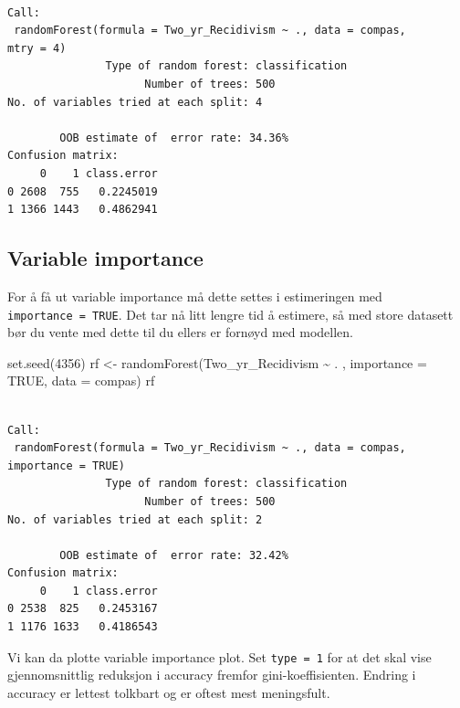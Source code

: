 \documentclass[
  letterpaper,
  DIV=11,
  numbers=noendperiod]{scrreprt}
\newenvironment{Shaded}{\begin{snugshade}}{\end{snugshade}}
\newcommand{\AttributeTok}[1]{\textcolor[rgb]{0.40,0.45,0.13}{#1}}
\newcommand{\ConstantTok}[1]{\textcolor[rgb]{0.56,0.35,0.01}{#1}}
\newcommand{\DecValTok}[1]{\textcolor[rgb]{0.68,0.00,0.00}{#1}}
\newcommand{\FunctionTok}[1]{\textcolor[rgb]{0.28,0.35,0.67}{#1}}
\newcommand{\NormalTok}[1]{\textcolor[rgb]{0.00,0.23,0.31}{#1}}
\newcommand{\OtherTok}[1]{\textcolor[rgb]{0.00,0.23,0.31}{#1}}
\newcommand{\SpecialCharTok}[1]{\textcolor[rgb]{0.37,0.37,0.37}{#1}}
\theoremstyle{definition}
\theoremstyle{remark}
\begin{document}
\begin{verbatim}

Call:
 randomForest(formula = Two_yr_Recidivism ~ ., data = compas,      mtry = 4) 
               Type of random forest: classification
                     Number of trees: 500
No. of variables tried at each split: 4

        OOB estimate of  error rate: 34.36%
Confusion matrix:
     0    1 class.error
0 2608  755   0.2245019
1 1366 1443   0.4862941
\end{verbatim}

\hypertarget{variable-importance}{%
\subsection{Variable importance}\label{variable-importance}}

For å få ut variable importance må dette settes i estimeringen med
\texttt{importance\ =\ TRUE}. Det tar nå litt lengre tid å estimere, så
med store datasett bør du vente med dette til du ellers er fornøyd med
modellen.

\begin{Shaded}
\begin{Highlighting}[]
\FunctionTok{set.seed}\NormalTok{(}\DecValTok{4356}\NormalTok{)}
\NormalTok{rf }\OtherTok{\textless{}{-}} \FunctionTok{randomForest}\NormalTok{(Two\_yr\_Recidivism }\SpecialCharTok{\textasciitilde{}}\NormalTok{ . , }
                   \AttributeTok{importance =} \ConstantTok{TRUE}\NormalTok{, }
                    \AttributeTok{data =}\NormalTok{ compas)}
\NormalTok{rf}
\end{Highlighting}
\end{Shaded}

\begin{verbatim}

Call:
 randomForest(formula = Two_yr_Recidivism ~ ., data = compas,      importance = TRUE) 
               Type of random forest: classification
                     Number of trees: 500
No. of variables tried at each split: 2

        OOB estimate of  error rate: 32.42%
Confusion matrix:
     0    1 class.error
0 2538  825   0.2453167
1 1176 1633   0.4186543
\end{verbatim}

Vi kan da plotte variable importance plot. Set \texttt{type\ =\ 1} for
at det skal vise gjennomsnittlig reduksjon i accuracy fremfor
gini-koeffisienten. Endring i accuracy er lettest tolkbart og er oftest
mest meningsfult.
\end{document}
